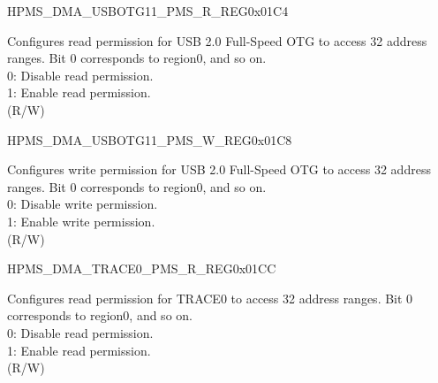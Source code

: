 \begin{register}{H}{PMS\_DMA\_USBOTG11\_PMS\_R\_REG}{0x01C4}\label{regdesc:PMSDMAUSBOTG11PMSRREG}
%
\regnewline%
\begin{regdesc}\begin{reglist}
\label{fielddesc:PMSDMAUSBOTG11RPMS}\item [PMS\_DMA\_USBOTG11\_R\_PMS] Configures read permission for USB 2.0 Full-Speed OTG to access 32 address ranges. Bit 0 corresponds to region0, and so on.\\
0: Disable read permission.\\
1: Enable read permission.\\ (R/W)
\end{reglist}\end{regdesc}
\end{register}


\begin{register}{H}{PMS\_DMA\_USBOTG11\_PMS\_W\_REG}{0x01C8}\label{regdesc:PMSDMAUSBOTG11PMSWREG}
%
\regnewline%
\begin{regdesc}\begin{reglist}
\label{fielddesc:PMSDMAUSBOTG11WPMS}\item [PMS\_DMA\_USBOTG11\_W\_PMS] Configures write permission for USB 2.0 Full-Speed OTG to access 32 address ranges. Bit 0 corresponds to region0, and so on.\\
0: Disable write permission.\\
1: Enable write permission.\\ (R/W)
\end{reglist}\end{regdesc}
\end{register}


\begin{register}{H}{PMS\_DMA\_TRACE0\_PMS\_R\_REG}{0x01CC}\label{regdesc:PMSDMATRACE0PMSRREG}
%
\regnewline%
\begin{regdesc}\begin{reglist}
\label{fielddesc:PMSDMATRACE0RPMS}\item [PMS\_DMA\_TRACE0\_R\_PMS] Configures read permission for TRACE0 to access 32 address ranges. Bit 0 corresponds to region0, and so on.\\
0: Disable read permission.\\
1: Enable read permission.\\ (R/W)
\end{reglist}\end{regdesc}
\end{register}


